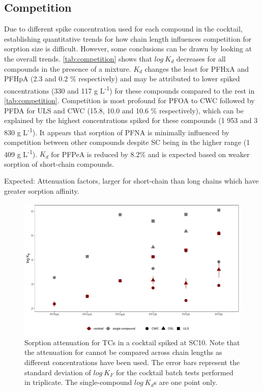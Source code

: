 \subsection{Competition}
Due to different spike concentration used for each compound in the cocktail, establishing quantitative trends for how chain length influences competition for sorption size is difficult. However, some conclusions can be drawn by looking at the overall trends. \cref{tab:competition} shows that $log~K_d$ decreases for all compounds in the presence of a mixture. $K_d$ changes the least for PFHxA and PFHpA (2.3 and 0.2 \% respectively) and may be attributed to lower spiked concentrations (330 and 117 \textmu g L\textsuperscript{-1}) for these compounds compared to the rest in \cref{tab:competition}. Competition is most profound for PFOA to CWC followed by PFDA for ULS and CWC (15.8, 10.0 and 10.6 \% respectively), which can be explained by the highest concentrations spiked for these compounds (1 953 and 3 830 \textmu g L\textsuperscript{-1}). It appears that sorption of PFNA is minimally influenced by competition between other compounds despite SC being in the higher range (1 409 \textmu g L\textsuperscript{-1}). $K_d$ for PFPeA is reduced by 8.2\% and is expected based on weaker sorption of short-chain compounds.

Expected: Attenuation factors, larger for short-chain than long chains which have greater sorption affinity.

\begin{figure}
    \centering
    \includegraphics[width=\textwidth]{R/figs/C10_mixVsSingle_BC_plot.pdf}
    \caption{Sorption attenuation for TCs in a cocktail spiked at SC10. Note that the attenuation for cannot be compared across chain lengths as different concentrations have been used. The error bars represent the standard deviation of $log~K_F$ for the cocktail batch tests performed in triplicate. The single-compound $log~K_d$s are one point only.}
    \label{fig:competition}
\end{figure}

